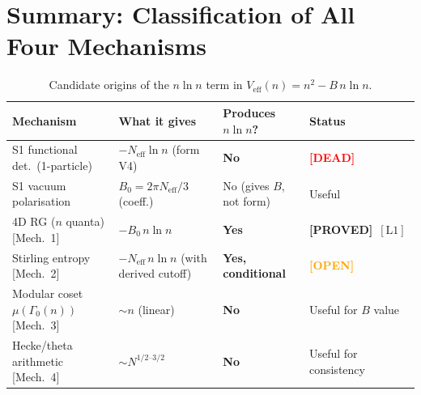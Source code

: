 \documentclass[12pt,a4paper]{article}
\theoremstyle{definition}
\theoremstyle{remark}
\newcommand{\Neff}{N_{\mathrm{eff}}}
\newcommand{\DEAD}{\textcolor{red}{\textbf{[DEAD]}}}
\newcommand{\OPEN}{\textcolor{orange}{\textbf{[OPEN]}}}
\newcommand{\PROVED}{\textcolor{green!60!black}{\textbf{[PROVED]}}}
\newcommand{\Lone}{$[\mathrm{L1}]$}
\begin{document}
\section{Summary: Classification of All Four Mechanisms}
\label{sec:nlogn:summary}

\begin{table}[h]
\centering
\caption{Candidate origins of the $n\ln n$ term in
         $V_\mathrm{eff}(n) = n^2 - B\,n\ln n$.}
\label{tab:nlogn:summary}
\begin{tabular}{llll}
\toprule
\textbf{Mechanism} & \textbf{What it gives} & \textbf{Produces $n\ln n$?}
  & \textbf{Status} \\
\midrule
S1 functional det.\ (1-particle) & $-\Neff\ln n$ (form V4)
  & \textbf{No} & \DEAD \\
S1 vacuum polarisation            & $B_0 = 2\pi\Neff/3$ (coeff.) 
  & No (gives $B$, not form) & Useful \\
4D RG ($n$ quanta) [Mech.\ 1]    & $-B_0\,n\ln n$
  & \textbf{Yes} & \PROVED\ \Lone \\
Stirling entropy [Mech.\ 2]      & $-\Neff\,n\ln n$ (with derived cutoff)
  & \textbf{Yes, conditional} & \OPEN \\
Modular coset $\mu(\Gamma_0(n))$ [Mech.\ 3] & $\sim n$ (linear)
  & \textbf{No} & Useful for $B$ value \\
Hecke/theta arithmetic [Mech.\ 4] & $\sim N^{1/2\text{--}3/2}$
  & \textbf{No} & Useful for consistency \\
\bottomrule
\end{tabular}
\end{table}
\end{document}
